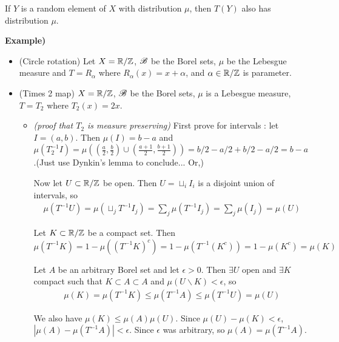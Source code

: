 \documentclass[12pt,a4paper]{report}
\begin{document}
If $Y$ is a random element of $X$ with distribution $\mu$, then $T(Y)$ also has distribution $\mu$.
\s

\textbf{Example)}

\begin{itemize}
\item (Circle rotation) Let $X = \mathbb{R}/ \mathbb{Z}$, $\mathscr{B}$ be the Borel sets, $\mu$ be the Lebesgue measure and $T = R_{\alpha}$ where $R_{\alpha}(x) = x+\alpha$, and $\alpha \in \mathbb{R}/\mathbb{Z}$ is parameter.

\item (Times 2 map) $X = \mathbb{R}/\mathbb{Z}$, $\mathscr{B}$ be the Borel sets, $\mu$ is a Lebesgue measure, $T = T_2$ where $T_2(x) = 2x$.

\begin{itemize}
\item[ ] \textsl{(proof that $T_2$ is measure preserving)} First prove for intervals : let $I = (a,b)$. Then $\mu(I) = b-a$ and $\mu(T_2^{-1} I)= \mu((\frac{a}{2},\frac{b}{2}) \cup (\frac{a+1}{2},\frac{b+1}{2})) = b/2 - a/2 + b/2 - a/2 = b-a$.(Just use Dynkin's lemma to conclude... Or,)

Now let $U \subset \mathbb{R} / \mathbb{Z}$ be open. Then $U = \sqcup_{i} I_i$ is a disjoint union of intervals, so
\begin{align*}
\mu(T^{-1}U) = \mu(\sqcup_j T^{-1}I_j) = \sum_j \mu(T^{-1} I_j) = \sum_{j} \mu(I_j) = \mu(U)
\end{align*}

Let $K \subset \mathbb{R}/\mathbb{Z}$ be a compact set. Then
\begin{equation*}
\mu(T^{-1}K) = 1- \mu((T^{-1}K)^c) = 1- \mu(T^{-1}(K^c)) = 1- \mu(K^c) = \mu(K)
\end{equation*}

Let $A$ be an arbitrary Borel set and let $\epsilon >0$. Then $\exists U$ open and $\exists K$ compact such that $K\subset A \subset A$ and $\mu(U \backslash K) < \epsilon$, so
\begin{align*}
\mu(K) = \mu(T^{-1} K) \leq \mu(T^{-1} A) \leq \mu(T^{-1} U) = \mu(U)
\end{align*}

We also have $\mu(K) \leq \mu(A) \mu(U)$. Since $\mu(U) - \mu(K) < \epsilon$, $|\mu(A) - \mu(T^{-1}A) | < \epsilon$. Since $\epsilon$ was arbitrary, so $\mu(A) = \mu(T^{-1} A)$.

\eop
\end{itemize}
\end{itemize}
\s
\end{document}

